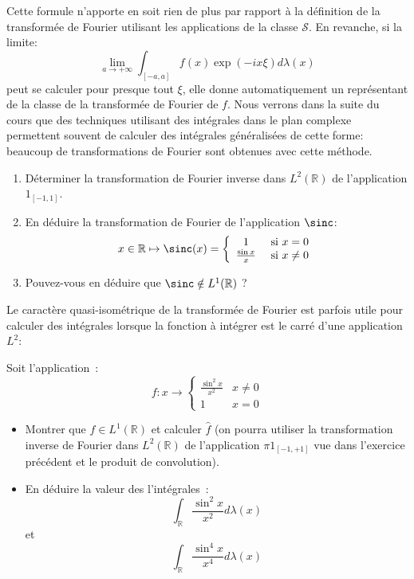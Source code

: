 \begin{rem}
Cette formule n'apporte en soit rien de plus par rapport à la définition de la
transformée de Fourier utilisant les applications de la classe $\mathcal{S}$. En
revanche, si la limite:
\[
 \lim_{a \to +\infty} \int_{[-a,a]} f(x) \exp(-ix\xi) d\lambda(x)
\]
peut se calculer pour presque tout $\xi$, elle donne automatiquement un
représentant de la classe de la transformée de Fourier de $f$. Nous
verrons dans la suite du cours que des techniques utilisant des intégrales dans
le plan complexe permettent souvent de calculer des intégrales
généralisées de cette forme: beaucoup de transformations de Fourier sont
obtenues avec cette méthode.
\begin{exercice}
\begin{enumerate}
  \item Déterminer la transformation de Fourier inverse dans $L^2(\mathbb{R})$
  de l'application $1_{[-1,1]}$.
  \item En déduire la transformation de Fourier de l'application $\sinc$:
  \[
  x \in \mathbb{R} \mapsto \sinc(x) = \left\{
  \begin{array}{cc}
  	1 & \text{ si } x=0 \\
  	\frac{\sin x}{x} & \text{ si } x \neq 0 
  \end{array}
  \right.
  \]
  \item Pouvez-vous en déduire que $\sinc \notin L^1(\mathbb{R})$ ?
\end{enumerate}
\end{exercice}
Le caractère quasi-isométrique de la transformée de Fourier est parfois utile
pour calculer des intégrales lorsque la fonction à intégrer est le carré d'une
application $L^2$:
\begin{exercice}
Soit l'application~:
\[
f : x \to \left \{
\begin{array}{ll}
\frac{\sin^2 x }{x^2} & x \neq 0 \\
1 & x = 0
\end{array}
\right .
\]
\begin{itemize}
\item Montrer que $f \in L^1(\mathbb{R})$ et calculer $\widehat{f}$
(on pourra utiliser la transformation inverse de Fourier dans
$L^2(\mathbb{R})$ de l'application $\pi 1_{[-1,+1]}$ vue dans l'exercice
précédent et le produit de convolution).
\item En déduire la valeur des l'intégrales~:
\[
\int_{\mathbb{R}} \frac{\sin^2 x}{x^2} d \lambda(x)
\]
et
\[
\int_{\mathbb{R}} \frac{\sin^4 x}{x^4} d \lambda(x)
\]
\end{itemize}
\end{exercice}
\end{rem}

